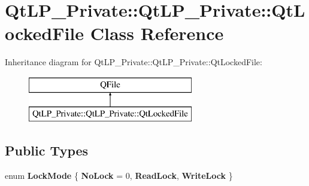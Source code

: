 \hypertarget{class_qt_l_p___private_1_1_qt_l_p___private_1_1_qt_locked_file}{}\section{Qt\+L\+P\+\_\+\+Private\+:\+:Qt\+L\+P\+\_\+\+Private\+:\+:Qt\+Locked\+File Class Reference}
\label{class_qt_l_p___private_1_1_qt_l_p___private_1_1_qt_locked_file}
Inheritance diagram for Qt\+L\+P\+\_\+\+Private\+:\+:Qt\+L\+P\+\_\+\+Private\+:\+:Qt\+Locked\+File\+:\begin{figure}[H]
\begin{center}
\leavevmode
\includegraphics[height=2.000000cm]{class_qt_l_p___private_1_1_qt_l_p___private_1_1_qt_locked_file}
\end{center}
\end{figure}
\subsection*{Public Types}
\begin{DoxyCompactItemize}
\item 
\mbox{\label{class_qt_l_p___private_1_1_qt_l_p___private_1_1_qt_locked_file_ac8e6aeffe078d740e4ece31e18ad31a3}} 
enum {\bfseries Lock\+Mode} \{ {\bfseries No\+Lock} = 0, 
{\bfseries Read\+Lock}, 
{\bfseries Write\+Lock}
 \}
\end{DoxyCompactItemize}
